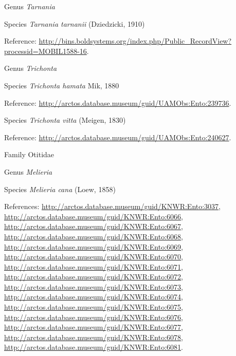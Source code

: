 \documentclass[9pt, article]{memoir}
\begin{document}
\begin{multicols}{2}
\vspace{6pt}\noindent\hspace{30pt}Genus \textit{Tarnania}


\vspace{6pt}\noindent\hspace{36pt}Species \textit{Tarnania tarnanii} (Dziedzicki, 1910)


Reference: 
\url{http://bins.boldsystems.org/index.php/Public_RecordView?processid=MOBIL1588-16}.

\vspace{6pt}\noindent\hspace{30pt}Genus \textit{Trichonta}


\vspace{6pt}\noindent\hspace{36pt}Species \textit{Trichonta hamata} Mik, 1880


Reference: 
\url{http://arctos.database.museum/guid/UAMObs:Ento:239736}.

\vspace{6pt}\noindent\hspace{36pt}Species \textit{Trichonta vitta} (Meigen, 1830)


Reference: 
\url{http://arctos.database.museum/guid/UAMObs:Ento:240627}.

\vspace{6pt}\noindent\hspace{24pt}Family Otitidae


\vspace{6pt}\noindent\hspace{30pt}Genus \textit{Melieria}


\vspace{6pt}\noindent\hspace{36pt}Species \textit{Melieria cana} (Loew, 1858)


References: 
\url{http://arctos.database.museum/guid/KNWR:Ento:3037}, 
\url{http://arctos.database.museum/guid/KNWR:Ento:6066}, 
\url{http://arctos.database.museum/guid/KNWR:Ento:6067}, 
\url{http://arctos.database.museum/guid/KNWR:Ento:6068}, 
\url{http://arctos.database.museum/guid/KNWR:Ento:6069}, 
\url{http://arctos.database.museum/guid/KNWR:Ento:6070}, 
\url{http://arctos.database.museum/guid/KNWR:Ento:6071}, 
\url{http://arctos.database.museum/guid/KNWR:Ento:6072}, 
\url{http://arctos.database.museum/guid/KNWR:Ento:6073}, 
\url{http://arctos.database.museum/guid/KNWR:Ento:6074}, 
\url{http://arctos.database.museum/guid/KNWR:Ento:6075}, 
\url{http://arctos.database.museum/guid/KNWR:Ento:6076}, 
\url{http://arctos.database.museum/guid/KNWR:Ento:6077}, 
\url{http://arctos.database.museum/guid/KNWR:Ento:6078}, 
\url{http://arctos.database.museum/guid/KNWR:Ento:6081}.


\end{multicols}
\end{document}
